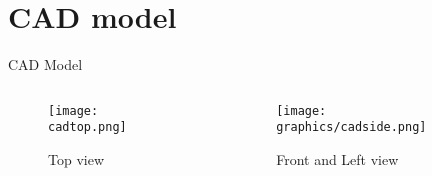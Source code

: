 \section{CAD model}
\begin{frame}{CAD Model}
    \begin{columns}[T] %
        \begin{column}{.48\textwidth}
        \begin{figure}
	    \texttt{[image: cadtop.png]}
	    \caption{Top view}
        \end{figure}
        \end{column}%
        \hfill%
        \begin{column}{.48\textwidth}
        \begin{figure}
	    \texttt{[image: graphics/cadside.png]}
	    \caption{Front and Left view}
        \end{figure}
        \end{column}%
    \end{columns}
\end{frame}


